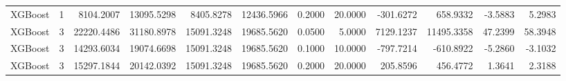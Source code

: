 \begin{tabular}{lrrrrrrrrrrr}
XGBoost & 1 & 8104.2007 & 13095.5298 & 8405.8278 & 12436.5966 & 0.2000 & 20.0000 & -301.6272 & 658.9332 & -3.5883 & 5.2983 \\
XGBoost & 3 & 22220.4486 & 31180.8978 & 15091.3248 & 19685.5620 & 0.0500 & 5.0000 & 7129.1237 & 11495.3358 & 47.2399 & 58.3948 \\
XGBoost & 3 & 14293.6034 & 19074.6698 & 15091.3248 & 19685.5620 & 0.1000 & 10.0000 & -797.7214 & -610.8922 & -5.2860 & -3.1032 \\
XGBoost & 3 & 15297.1844 & 20142.0392 & 15091.3248 & 19685.5620 & 0.2000 & 20.0000 & 205.8596 & 456.4772 & 1.3641 & 2.3188 \\
\bottomrule
\end{tabular}
